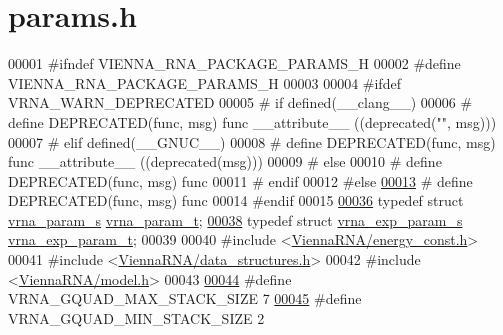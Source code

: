 \hypertarget{params_8h_source}{}\section{params.\+h}
\label{params_8h_source}

\begin{DoxyCode}
00001 \textcolor{preprocessor}{#ifndef VIENNA\_RNA\_PACKAGE\_PARAMS\_H}
00002 \textcolor{preprocessor}{#define VIENNA\_RNA\_PACKAGE\_PARAMS\_H}
00003 
00004 \textcolor{preprocessor}{#ifdef VRNA\_WARN\_DEPRECATED}
00005 \textcolor{preprocessor}{# if defined(\_\_clang\_\_)}
00006 \textcolor{preprocessor}{#  define DEPRECATED(func, msg) func \_\_attribute\_\_ ((deprecated("", msg)))}
00007 \textcolor{preprocessor}{# elif defined(\_\_GNUC\_\_)}
00008 \textcolor{preprocessor}{#  define DEPRECATED(func, msg) func \_\_attribute\_\_ ((deprecated(msg)))}
00009 \textcolor{preprocessor}{# else}
00010 \textcolor{preprocessor}{#  define DEPRECATED(func, msg) func}
00011 \textcolor{preprocessor}{# endif}
00012 \textcolor{preprocessor}{#else}
\mbox{\hyperlink{params_8h_aab347a3c03fbe8e7319551b9fa0cce4a}{00013}} \textcolor{preprocessor}{# define DEPRECATED(func, msg) func}
00014 \textcolor{preprocessor}{#endif}
00015 
\mbox{\hyperlink{group__energy__parameters_ga8a69ca7d787e4fd6079914f5343a1f35}{00036}} \textcolor{keyword}{typedef} \textcolor{keyword}{struct  }\mbox{\hyperlink{group__energy__parameters_structvrna__param__s}{vrna\_param\_s}} \mbox{\hyperlink{group__energy__parameters_structvrna__param__s}{vrna\_param\_t}};
\mbox{\hyperlink{group__energy__parameters_ga01d8b92fe734df8d79a6169482c7d8d8}{00038}} \textcolor{keyword}{typedef} \textcolor{keyword}{struct  }\mbox{\hyperlink{group__energy__parameters_structvrna__exp__param__s}{vrna\_exp\_param\_s}} \mbox{\hyperlink{group__energy__parameters_structvrna__exp__param__s}{vrna\_exp\_param\_t}};
00039 
00040 \textcolor{preprocessor}{#include <\mbox{\hyperlink{energy__const_8h}{ViennaRNA/energy\_const.h}}>}
00041 \textcolor{preprocessor}{#include <\mbox{\hyperlink{data__structures_8h}{ViennaRNA/data\_structures.h}}>}
00042 \textcolor{preprocessor}{#include <\mbox{\hyperlink{model_8h}{ViennaRNA/model.h}}>}
00043 
\mbox{\hyperlink{group__energy__parameters_gab7b5159125a90babbd3b81319305f35f}{00044}} \textcolor{preprocessor}{#define   VRNA\_GQUAD\_MAX\_STACK\_SIZE     7}
\mbox{\hyperlink{group__energy__parameters_gae24794ad38d2bf86d4c1e2f24cf35230}{00045}} \textcolor{preprocessor}{#define   VRNA\_GQUAD\_MIN\_STACK\_SIZE     2}

\end{DoxyCode}
